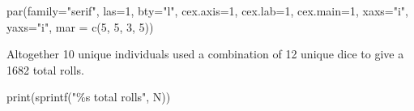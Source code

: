 \documentclass[
  letterpaper,
  DIV=11,
  numbers=noendperiod]{scrartcl}
\newenvironment{Shaded}{\begin{snugshade}}{\end{snugshade}}
\newcommand{\AttributeTok}[1]{\textcolor[rgb]{0.40,0.45,0.13}{#1}}
\newcommand{\DecValTok}[1]{\textcolor[rgb]{0.68,0.00,0.00}{#1}}
\newcommand{\FunctionTok}[1]{\textcolor[rgb]{0.28,0.35,0.67}{#1}}
\newcommand{\NormalTok}[1]{\textcolor[rgb]{0.00,0.23,0.31}{#1}}
\newcommand{\OtherTok}[1]{\textcolor[rgb]{0.00,0.23,0.31}{#1}}
\newcommand{\SpecialCharTok}[1]{\textcolor[rgb]{0.37,0.37,0.37}{#1}}
\newcommand{\StringTok}[1]{\textcolor[rgb]{0.13,0.47,0.30}{#1}}
\begin{document}
\begin{Shaded}
\begin{Highlighting}[]
\FunctionTok{par}\NormalTok{(}\AttributeTok{family=}\StringTok{"serif"}\NormalTok{, }\AttributeTok{las=}\DecValTok{1}\NormalTok{, }\AttributeTok{bty=}\StringTok{"l"}\NormalTok{,}
    \AttributeTok{cex.axis=}\DecValTok{1}\NormalTok{, }\AttributeTok{cex.lab=}\DecValTok{1}\NormalTok{, }\AttributeTok{cex.main=}\DecValTok{1}\NormalTok{,}
    \AttributeTok{xaxs=}\StringTok{"i"}\NormalTok{, }\AttributeTok{yaxs=}\StringTok{"i"}\NormalTok{, }\AttributeTok{mar =} \FunctionTok{c}\NormalTok{(}\DecValTok{5}\NormalTok{, }\DecValTok{5}\NormalTok{, }\DecValTok{3}\NormalTok{, }\DecValTok{5}\NormalTok{))}
\end{Highlighting}
\end{Shaded}

\begin{Shaded}
\end{Shaded}

Altogether 10 unique individuals used a combination of 12 unique dice to
give a 1682 total rolls.

\begin{Shaded}
\begin{Highlighting}[]
\FunctionTok{print}\NormalTok{(}\FunctionTok{sprintf}\NormalTok{(}\StringTok{"\%s total rolls"}\NormalTok{, N))}
\end{Highlighting}
\end{Shaded}
\end{document}
